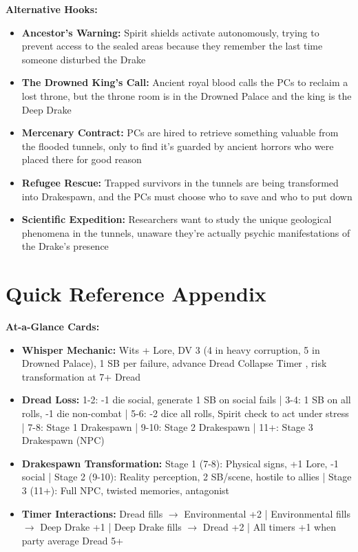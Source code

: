 \documentclass[11pt]{article}
\begin{document}
\textbf{Alternative Hooks:}
\begin{itemize}
\item \textbf{Ancestor's Warning:} Spirit shields activate autonomously, trying to prevent access to the sealed areas because they remember the last time someone disturbed the Drake
\item \textbf{The Drowned King's Call:} Ancient royal blood calls the PCs to reclaim a lost throne, but the throne room is in the Drowned Palace and the king is the Deep Drake
\item \textbf{Mercenary Contract:} PCs are hired to retrieve something valuable from the flooded tunnels, only to find it's guarded by ancient horrors who were placed there for good reason
\item \textbf{Refugee Rescue:} Trapped survivors in the tunnels are being transformed into Drakespawn, and the PCs must choose who to save and who to put down
\item \textbf{Scientific Expedition:} Researchers want to study the unique geological phenomena in the tunnels, unaware they're actually psychic manifestations of the Drake's presence
\end{itemize}

\section{Quick Reference Appendix}

\textbf{At-a-Glance Cards:}
\begin{itemize}
\item \textbf{Whisper Mechanic:} Wits + Lore, DV 3 (4 in heavy corruption, 5 in Drowned Palace), 1 SB per failure, advance Dread Collapse Timer , risk transformation at 7+ Dread
\item \textbf{Dread Loss:} 1-2: -1 die social, generate 1 SB on social fails | 3-4: 1 SB on all rolls, -1 die non-combat | 5-6: -2 dice all rolls, Spirit check to act under stress | 7-8: Stage 1 Drakespawn | 9-10: Stage 2 Drakespawn | 11+: Stage 3 Drakespawn (NPC)
\item \textbf{Drakespawn Transformation:} Stage 1 (7-8): Physical signs, +1 Lore, -1 social | Stage 2 (9-10): Reality perception, 2 SB/scene, hostile to allies | Stage 3 (11+): Full NPC, twisted memories, antagonist
\item \textbf{Timer Interactions:} Dread fills $\rightarrow$ Environmental +2 | Environmental fills $\rightarrow$ Deep Drake +1 | Deep Drake fills $\rightarrow$ Dread +2 | All timers +1 when party average Dread 5+
\end{itemize}
\end{document}
